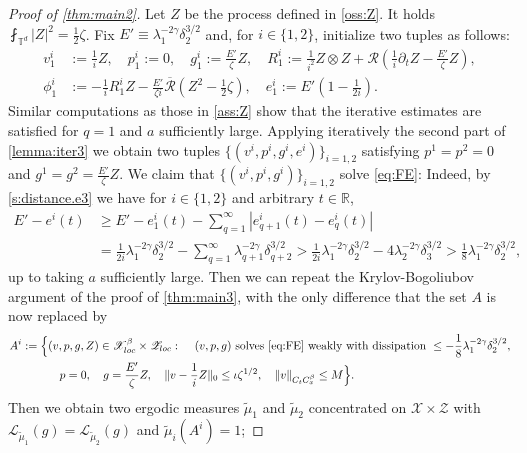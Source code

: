 \documentclass[10pt,a4paper]{amsart}
\numberwithin{equation}{section}
\numberwithin{corollario}{section}
\numberwithin{lemma}{section}
\numberwithin{prop}{section}
\theoremstyle{definition}
\theoremstyle{remark}
\newcommand{\R}{\mathbb{R}}
\newcommand{\T}{\mathbb{T}}
\newcommand{\qq}{_{q+1}}
\newcommand{\qqq}{_{q+2}}
\begin{document}
\begin{proof}[Proof of \autoref{thm:main2}]
Let $Z$ be the process defined in \autoref{oss:Z}. It holds $\fint_{\T^d}|Z|^2 = \frac12 \zeta$.
Fix $E' \equiv \lambda_1^{-2\gamma} \delta_2^{3/2}$ and, for $i \in \{1,2\}$, initialize two tuples as follows:
   \begin{align}
    v^i_1 &:= \frac1i Z,
    \quad
    p^i_1:=0,
    \quad
    g^i_1 := \frac{E'}{\zeta} Z,
    \quad
    R^i_1 := \frac{1}{i^2} Z \otimes Z + \mathcal{R}\left( \frac1i \partial_t Z- \frac{E'}{\zeta} Z \right),
    \\
    \phi^i_1 &:= -\frac1i R_1^i Z - \frac{E'}{\zeta i} \overline{\mathcal{R}}\left( Z^2-\frac12 \zeta \right),
    \quad
    e^i_1 := E' \left( 1-\frac{1}{2i}\right).
\end{align}
Similar computations as those in \autoref{ass:Z} show that the iterative estimates are satisfied for $q=1$ and $a$ sufficiently large.
Applying iteratively the second part of \autoref{lemma:iter3} we obtain two tuples $\{(v^i,p^i,g^i,e^i)\}_{i=1,2}$ satisfying $p^1=p^2=0$ and $g^1=g^2=\frac{E'}{\zeta}Z$.
We claim that $\{(v^i,p^i,g^i)\}_{i=1,2}$ solve \eqref{eq:FE}: Indeed, by \eqref{s:distance.e3} we have for $i \in \{1,2\}$ and arbitrary $t \in \R$,
\begin{align}
    E' - e^i(t) &\geq E' - e^i_1(t) - \sum_{q=1}^\infty |e^i\qq(t)-e^i_q(t)|
    \\
    &= \frac{1}{2i} \lambda_1^{-2\gamma} \delta_2^{3/2}
    -
    \sum_{q=1}^\infty
    \lambda\qq^{-2\gamma} \delta\qqq^{3/2}
    >
    \frac{1}{2i} \lambda_1^{-2\gamma} \delta_2^{3/2}
    -
    4 \lambda_2^{-2\gamma} \delta_3^{3/2}
    >
    \frac{1}{8} \lambda_1^{-2\gamma} \delta_2^{3/2},
\end{align}
up to taking $a$ sufficiently large.
Then we can repeat the Krylov-Bogoliubov argument of the proof of \autoref{thm:main3}, with the only difference that the set $A$ is now replaced by
\begin{align}
A^i := \Big\{ &(v,p,g,Z) \in \mathscr{X}^\beta_{loc} \times \mathscr{Z}_{loc}:\quad \,(v,p,g) \mbox{ solves \eqref{eq:FE} weakly with dissipation } \leq -\frac{1}{8} \lambda_1^{-2\gamma} \delta_2^{3/2},
\\
&\quad {p}=0, \quad g = \frac{E'}{\zeta}Z, \quad\|v-\frac{1}{i}Z\|_{0} \leq \iota \zeta^{1/2},
\quad\|v\|_{C_tC^\beta_x} 
\leq 
M
 \Big\}.
\end{align}
Then we obtain two ergodic measures $\tilde\mu_1$ and $\tilde\mu_2$ concentrated on $\mathscr{X} \times \mathscr{Z}$ with $\mathscr{L}_{\tilde\mu_1}(g)=\mathscr{L}_{\tilde\mu_2}(g)$ and $\tilde\mu_i(A^i)=1$;

\end{proof}
\end{document}

